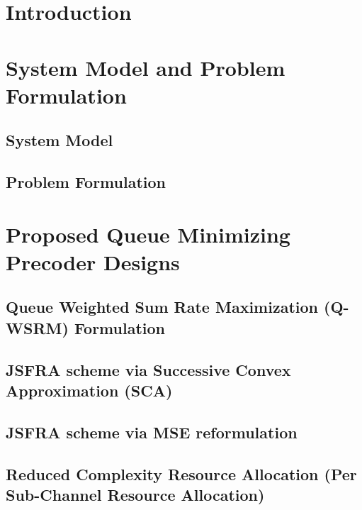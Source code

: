 \documentclass[11pt,draftcls,onecolumn,letterpaper]{./../Styles/IEEEtran}
\begin{document}

\begin{abstract}

\end{abstract}

\acresetall
\section{Introduction} \label{sec-1}


\section{System Model and Problem Formulation} \label{sec-2-3.2}
\subsection{System Model} \label{sec-2}

\subsection{Problem Formulation} \label{sec-3.2}


\section{Proposed Queue Minimizing Precoder Designs} \label{sec-3}


\subsection{Queue Weighted Sum Rate Maximization (\acs{Q-WSRM}) Formulation} \label{sec-3.1}


\subsection{\acs{JSFRA} scheme via Successive Convex Approximation (\acs{SCA})} \label{sec-3.2.1}



\subsection{\ac{JSFRA} scheme via MSE reformulation} \label{sec-3.3}


\subsection{Reduced Complexity Resource Allocation (Per Sub-Channel Resource Allocation)} \label{sec-3.4}

\end{document}
